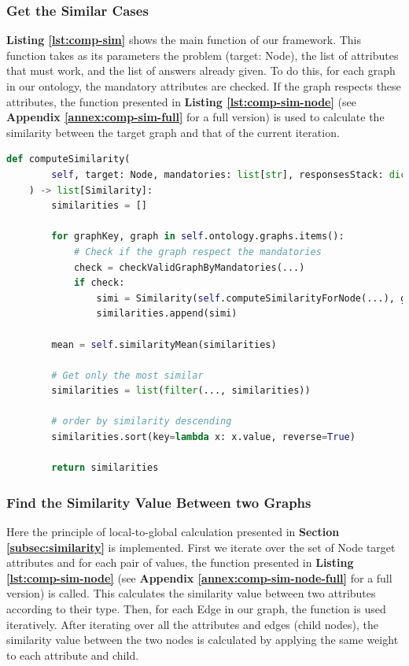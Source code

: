 \subsubsection{Get the Similar Cases}
\textbf{Listing \ref{lst:comp-sim}} shows the main function of our framework. This function takes as its parameters the problem (target: Node), the list of attributes that must work, and the list of answers already given. To do this, for each graph in our ontology, the mandatory attributes are checked. If the graph respects these attributes, the function presented in \textbf{Listing \ref{lst:comp-sim-node}} (see \textbf{Appendix \ref{annex:comp-sim-full}} for a full version) is used to calculate the similarity between the target graph and that of the current iteration.\\


\begin{lstlisting}[language=Python, caption=Function to Find the Similarity Between One Case and All the Cases in the Data-Base, label={lst:comp-sim}]
def computeSimilarity(
        self, target: Node, mandatories: list[str], responsesStack: dict[str, Any]
    ) -> list[Similarity]:
        similarities = []

        for graphKey, graph in self.ontology.graphs.items():
            # Check if the graph respect the mandatories
            check = checkValidGraphByMandatories(...)
            if check:
                simi = Similarity(self.computeSimilarityForNode(...), graph)
                similarities.append(simi)

        mean = self.similarityMean(similarities)

        # Get only the most similar
        similarities = list(filter(..., similarities))

        # order by similarity descending
        similarities.sort(key=lambda x: x.value, reverse=True)

        return similarities
\end{lstlisting}
    
    
    
\subsubsection{Find the Similarity Value Between two Graphs} 
Here the principle of local-to-global calculation presented in \textbf{Section \ref{subsec:similarity}} is implemented. First we iterate over the set of Node target attributes and for each pair of values, the function presented in \textbf{Listing \ref{lst:comp-sim-node}} (see \textbf{Appendix \ref{annex:comp-sim-node-full}} for a full version) is called. This calculates the similarity value between two attributes according to their type. Then, for each Edge in our graph, the function is used iteratively.
After iterating over all the attributes and edges (child nodes), the similarity value between the two nodes is calculated by applying the same weight to each attribute and child.\\

